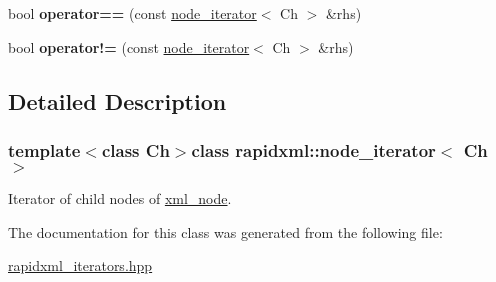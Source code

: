 \begin{DoxyCompactItemize}
\item 
\hypertarget{classrapidxml_1_1node__iterator_a5cb8a3b0d65a1a2517995e986a4debfd}{bool {\bfseries operator==} (const \hyperlink{classrapidxml_1_1node__iterator}{node\+\_\+iterator}$<$ Ch $>$ \&rhs)}\label{classrapidxml_1_1node__iterator_a5cb8a3b0d65a1a2517995e986a4debfd}

\item 
\hypertarget{classrapidxml_1_1node__iterator_a20f1e25347d7e3856694f18597f7c8e2}{bool {\bfseries operator!=} (const \hyperlink{classrapidxml_1_1node__iterator}{node\+\_\+iterator}$<$ Ch $>$ \&rhs)}\label{classrapidxml_1_1node__iterator_a20f1e25347d7e3856694f18597f7c8e2}

\end{DoxyCompactItemize}


\subsection{Detailed Description}
\subsubsection*{template$<$class Ch$>$class rapidxml\+::node\+\_\+iterator$<$ Ch $>$}

Iterator of child nodes of \hyperlink{singletonrapidxml_1_1xml__node}{xml\+\_\+node}. 

The documentation for this class was generated from the following file\+:\begin{DoxyCompactItemize}
\item 
\hyperlink{rapidxml__iterators_8hpp}{rapidxml\+\_\+iterators.\+hpp}\end{DoxyCompactItemize}
